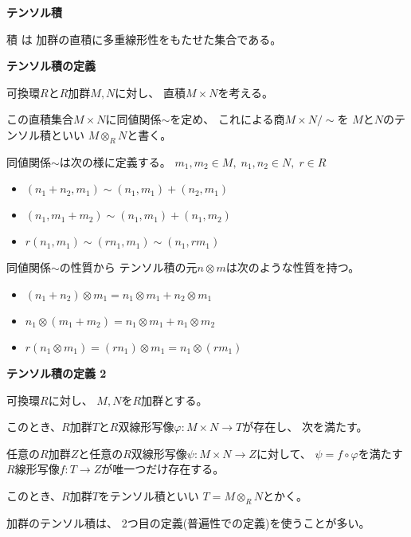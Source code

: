 \documentclass[12pt,b5paper]{ltjsarticle}
\begin{document}
\hrulefill

\textbf{テンソル積}

積 は
加群の直積に多重線形性をもたせた集合である。

\dotfill

\textbf{テンソル積の定義}

可換環$R$と$R$加群$M,N$に対し、
直積$M\times N$を考える。

この直積集合$M\times N$に同値関係$\sim$を定め、
これによる商$M\times N \slash \sim$を
$M$と$N$のテンソル積といい
$M \otimes_{R} N$と書く。

同値関係$\sim$は次の様に定義する。
$m_{1},m_{2}\in M,\; n_{1},n_{2}\in N,\; r\in R$
\begin{itemize}
 \item $(n_{1}+n_{2},m_{1})\sim (n_{1},m_{1})+(n_{2},m_{1})$
 \item $(n_{1},m_{1}+m_{2})\sim (n_{1},m_{1})+(n_{1},m_{2})$
 \item $r(n_{1},m_{1}) \sim (r n_{1},m_{1}) \sim (n_{1},r m_{1})$
\end{itemize}

同値関係$\sim$の性質から
テンソル積の元$n\otimes m$は次のような性質を持つ。
\begin{itemize}
 \item $(n_{1}+n_{2}) \otimes m_{1} = n_{1} \otimes m_{1}+n_{2} \otimes m_{1}$
 \item $n_{1} \otimes (m_{1}+m_{2}) = n_{1}\otimes m_{1} + n_{1}\otimes m_{2}$
 \item $r(n_{1}\otimes m_{1}) = (r n_{1})\otimes m_{1} = n_{1} \otimes (r m_{1})$
\end{itemize}


\dotfill

\textbf{テンソル積の定義 2}

可換環$R$に対し、
$M,N$を$R$加群とする。

このとき、$R$加群$T$と$R$双線形写像$\varphi : M\times N \to T$が存在し、
次を満たす。

任意の$R$加群$Z$と任意の$R$双線形写像$\psi : M \times N \to Z$に対して、
$\psi = f \circ \varphi$を満たす
$R$線形写像$f: T \to Z$が唯一つだけ存在する。

このとき、$R$加群$T$をテンソル積といい
$T = M \otimes_{R} N$とかく。

\hrulefill

加群のテンソル積は、
2つ目の定義(普遍性での定義)を使うことが多い。
\end{document}

